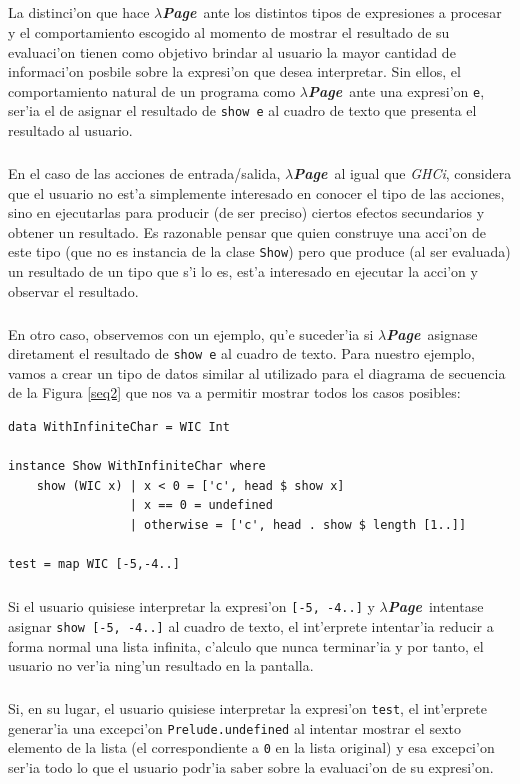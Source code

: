 \documentclass[a4paper]{article}
\newcommand{\hpage}{\textbf{\textsl{$\lambda$Page}}}
\begin{document}
\subparagraph{}La distinci'on que hace \hpage\ ante los distintos tipos de expresiones  a procesar y el comportamiento escogido al momento de mostrar el resultado de su evaluaci'on tienen como objetivo brindar al usuario la mayor cantidad de informaci'on posbile sobre la expresi'on que desea interpretar.  Sin ellos, el comportamiento natural de un programa como \hpage\ ante una expresi'on \texttt{e}, ser'ia el de asignar el resultado de \texttt{show e} al cuadro de texto que presenta el resultado al usuario.
\subparagraph{}En el caso de las acciones de entrada/salida, \hpage\ al igual que \textsl{GHCi}, considera que el usuario no est'a simplemente interesado en conocer el tipo de las acciones, sino en ejecutarlas para producir (de ser preciso) ciertos efectos secundarios y obtener un resultado.  Es razonable pensar que quien construye una acci'on de este tipo (que no es instancia de la clase \texttt{Show}) pero que produce (al ser evaluada) un resultado de un tipo que s'i lo es, est'a interesado en ejecutar la acci'on y observar el resultado.
\subparagraph{}En otro caso, observemos con un ejemplo, qu'e suceder'ia si \hpage\ asignase diretament el resultado de \texttt{show e} al cuadro de texto.  Para nuestro ejemplo, vamos a crear un tipo de datos similar al utilizado para el diagrama de secuencia de la Figura \ref{seq2} que nos va a permitir mostrar todos los casos posibles:
\begin{center}\begin{lstlisting}
data WithInfiniteChar = WIC Int

instance Show WithInfiniteChar where
    show (WIC x) | x < 0 = ['c', head $ show x]
			  	 | x == 0 = undefined
			  	 | otherwise = ['c', head . show $ length [1..]]

test = map WIC [-5,-4..]
\end{lstlisting}\end{center}
\subparagraph{}Si el usuario quisiese interpretar la expresi'on \texttt{[-5, -4..]} y \hpage\ intentase asignar \texttt{show [-5, -4..]} al cuadro de texto, el int'erprete intentar'ia reducir a forma normal una lista infinita, c'alculo que nunca terminar'ia y por tanto, el usuario no ver'ia ning'un resultado en la pantalla.
\subparagraph{}Si, en su lugar, el usuario quisiese interpretar la expresi'on \texttt{test}, el int'erprete generar'ia una excepci'on \texttt{Prelude.undefined} al intentar mostrar el sexto elemento de la lista (el correspondiente a \texttt{0} en la lista original) y esa excepci'on ser'ia todo lo que el usuario podr'ia saber sobre la evaluaci'on de su expresi'on.
\end{document}
